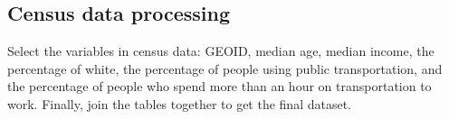 \documentclass[
]{article}
\newenvironment{Shaded}{\begin{snugshade}}{\end{snugshade}}
\newcommand{\DataTypeTok}[1]{\textcolor[rgb]{0.13,0.29,0.53}{#1}}
\newcommand{\DecValTok}[1]{\textcolor[rgb]{0.00,0.00,0.81}{#1}}
\newcommand{\KeywordTok}[1]{\textcolor[rgb]{0.13,0.29,0.53}{\textbf{#1}}}
\newcommand{\NormalTok}[1]{#1}
\newcommand{\OperatorTok}[1]{\textcolor[rgb]{0.81,0.36,0.00}{\textbf{#1}}}
\newcommand{\StringTok}[1]{\textcolor[rgb]{0.31,0.60,0.02}{#1}}
\begin{document}
\begin{Shaded}
\end{Shaded}

\hypertarget{census-data-processing}{%
\subsection{Census data processing}\label{census-data-processing}}

Select the variables in census data: GEOID, median age, median income,
the percentage of white, the percentage of people using public
transportation, and the percentage of people who spend more than an hour
on transportation to work. Finally, join the tables together to get the
final dataset.
\end{document}
